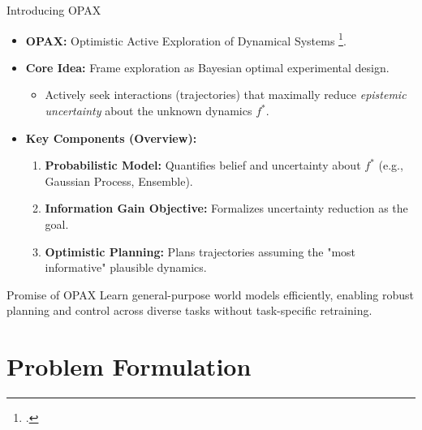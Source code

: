 \documentclass[11pt,aspectratio=169,handout]{beamer} %
\begin{document}
\begin{frame}{Introducing OPAX}
    \begin{itemize}
        \item \textbf{OPAX:} Optimistic Active Exploration of Dynamical Systems \footcite{sukhija2023optimistic}.
        \item \textbf{Core Idea:} Frame exploration as Bayesian optimal experimental design.
        \begin{itemize}
            \item Actively seek interactions (trajectories) that maximally reduce \textit{epistemic uncertainty} about the unknown dynamics $f^*$.
        \end{itemize}
        \pause
        \item \textbf{Key Components (Overview):}
        \begin{enumerate}
            \item \textbf{Probabilistic Model:} Quantifies belief and uncertainty about $f^*$ (e.g., Gaussian Process, Ensemble).
            \item \textbf{Information Gain Objective:} Formalizes uncertainty reduction as the goal.
            \item \textbf{Optimistic Planning:} Plans trajectories assuming the "most informative" plausible dynamics.
        \end{enumerate}
    \end{itemize}
    \vspace{1em}
    \begin{block}{Promise of OPAX}
        Learn general-purpose world models efficiently, enabling robust planning and control across diverse tasks without task-specific retraining.
    \end{block}
\end{frame}

\section{Problem Formulation}
\end{document}

